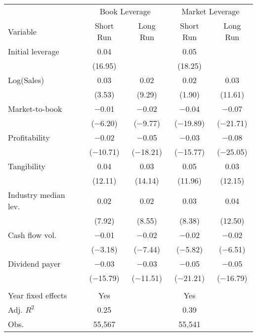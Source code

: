 \begin{tabular}{l*{4}{c}}
\toprule
 & \multicolumn{2}{c}{Book Leverage} & \multicolumn{2}{c}{Market Leverage} \\ \cmidrule(lr){2-3} \cmidrule(lr){4-5}
Variable & Short Run & Long Run & Short Run & Long Run \\ \midrule
Initial leverage&        0.04&            &        0.05&            \\
            &     (16.95)&            &     (18.25)&            \\
\addlinespace
Log(Sales)  &        0.03&        0.02&        0.02&        0.03\\
            &      (3.53)&      (9.29)&      (1.90)&     (11.61)\\
\addlinespace
Market-to-book&     $-$0.01&     $-$0.02&     $-$0.04&     $-$0.07\\
            &   ($-$6.20)&   ($-$9.77)&  ($-$19.89)&  ($-$21.71)\\
\addlinespace
Profitability&     $-$0.02&     $-$0.05&     $-$0.03&     $-$0.08\\
            &  ($-$10.71)&  ($-$18.21)&  ($-$15.77)&  ($-$25.05)\\
\addlinespace
Tangibility &        0.04&        0.03&        0.05&        0.03\\
            &     (12.11)&     (14.14)&     (11.96)&     (12.15)\\
\addlinespace
Industry median lev.&        0.02&        0.02&        0.03&        0.04\\
            &      (7.92)&      (8.55)&      (8.38)&     (12.50)\\
\addlinespace
Cash flow vol.&     $-$0.01&     $-$0.02&     $-$0.02&     $-$0.02\\
            &   ($-$3.18)&   ($-$7.44)&   ($-$5.82)&   ($-$6.51)\\
\addlinespace
Dividend payer&     $-$0.03&     $-$0.03&     $-$0.05&     $-$0.05\\
            &  ($-$15.79)&  ($-$11.51)&  ($-$21.21)&  ($-$16.79)\\
\\
Year fixed effects&         Yes&            &         Yes&            \\
Adj. $ R^2$ &        0.25&            &        0.39&            \\
Obs.        &      55,567&            &      55,541&            \\
\bottomrule
\end{tabular}
